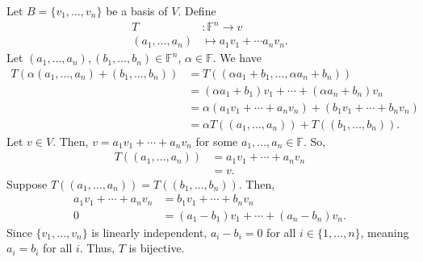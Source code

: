 \documentclass[10pt]{extarticle}
\begin{document}
  Let $B = \{v_1,\dots,v_n\}$ be a basis of $V$. Define
  \begin{align*}
    T&: \mathbb{F}^{n}\rightarrow v\\
    (a_1,\dots,a_n)&\mapsto a_1v_1 + \cdots a_nv_n.
  \end{align*}
  Let $(a_1,\dots,a_n),(b_1,\dots,b_n)\in \mathbb{F}^{n}$, $\alpha\in \mathbb{F}$. We have
  \begin{align*}
    T\left(\alpha(a_1,\dots,a_n) + (b_1,\dots,b_n)\right) &= T\left((\alpha a_1 + b_1,\dots,\alpha a_n + b_n)\right)\\
                                                          &= (\alpha a_1 + b_1)v_1 + \cdots + (\alpha a_n + b_n)v_n\\
                                                          &= \alpha (a_1v_1 + \cdots + a_nv_n) + (b_1v_1 + \cdots + b_nv_n)\\
                                                          &= \alpha T((a_1,\dots,a_n)) + T((b_1,\dots,b_n)).
  \end{align*}
  Let $v\in V$. Then, $v = a_1v_1 + \cdots + a_nv_n$ for some $a_1,\dots,a_n\in \mathbb{F}$. So,
  \begin{align*}
    T((a_1,\dots,a_n)) &= a_1v_1 + \cdots + a_nv_n\\
                       &= v.
  \end{align*}
  Suppose $T((a_1,\dots,a_n)) = T((b_1,\dots,b_n))$. Then,
  \begin{align*}
    a_1v_1 + \cdots + a_nv_n &= b_1v_1 + \cdots + b_nv_n\\
    0 &= (a_1-b_1)v_1 + \cdots + (a_n-b_n)v_n.
  \end{align*}
  Since $\{v_1,\dots,v_n\}$ is linearly independent, $a_i-b_i = 0$ for all $i\in \{1,\dots,n\}$, meaning $a_i = b_i$ for all $i$. Thus, $T$ is bijective.
\end{document}
